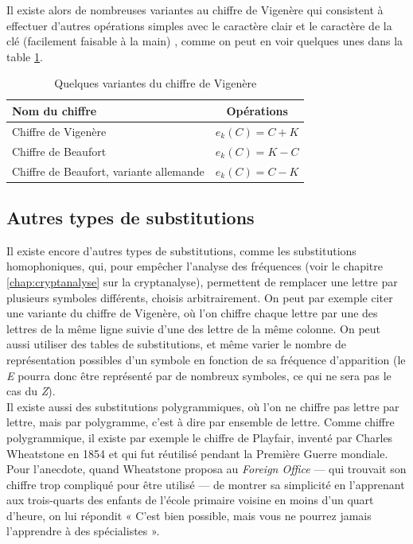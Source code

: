 Il existe alors de nombreuses variantes au chiffre de Vigenère qui
consistent à effectuer d'autres opérations simples avec le caractère
clair et le caractère de la clé (facilement faisable à la main) ,
comme on peut en voir quelques unes dans la table \ref{tab:VariantesVigenere}. 
\begin{table}[h]
  \caption{Quelques variantes du chiffre de Vigenère}
  \label{tab:VariantesVigenere}
  \begin{center}
    \begin{tabular}{|l|c|}
      \hline
      \textbf{Nom du chiffre} & \textbf{Opérations} \\
      \hline
      Chiffre de Vigenère & $e_k(C) = C + K$ \\ 
      \hline
      Chiffre de Beaufort & $e_k(C) = K - C$ \\
      \hline
      Chiffre de Beaufort, variante allemande & $e_k(C) = C - K$ \\
      \hline
    \end{tabular}
  \end{center}
\end{table}

\subsection{Autres types de substitutions\label{sec:SubstitutionsPolygrammiques}}
Il existe encore d'autres types de substitutions, comme les
substitutions homophoniques, qui, pour empêcher l'analyse des
fréquences (voir le chapitre \ref{chap:cryptanalyse} sur la
cryptanalyse), permettent de remplacer une lettre par plusieurs
symboles différents, choisis arbitrairement. On peut par exemple citer
une variante du chiffre de Vigenère, où l'on chiffre chaque lettre par
une des lettres de la même ligne suivie d'une des lettre de la même
colonne. On peut aussi utiliser des tables de substitutions, et même
varier le nombre de représentation possibles d'un symbole en fonction
de sa fréquence d'apparition (le \emph{E} pourra donc être représenté par
de nombreux symboles, ce qui ne sera pas le cas du \emph{Z}).\\

Il existe aussi des substitutions polygrammiques, où l'on ne chiffre
pas lettre par lettre, mais par polygramme, c'est à dire par ensemble
de lettre. Comme chiffre polygrammique, il existe par exemple le
chiffre de Playfair, inventé par Charles Wheatstone en 1854 et qui fut
réutilisé pendant la Première Guerre mondiale. Pour l'anecdote,
quand Wheatstone proposa au \emph{Foreign Office} --- qui trouvait son chiffre
trop compliqué pour être utilisé --- de montrer sa simplicité en
l'apprenant aux trois-quarts des enfants de l'école primaire voisine
en moins d'un quart d'heure, on lui répondit « C'est bien possible,
mais vous ne pourrez jamais l'apprendre à des spécialistes ».


